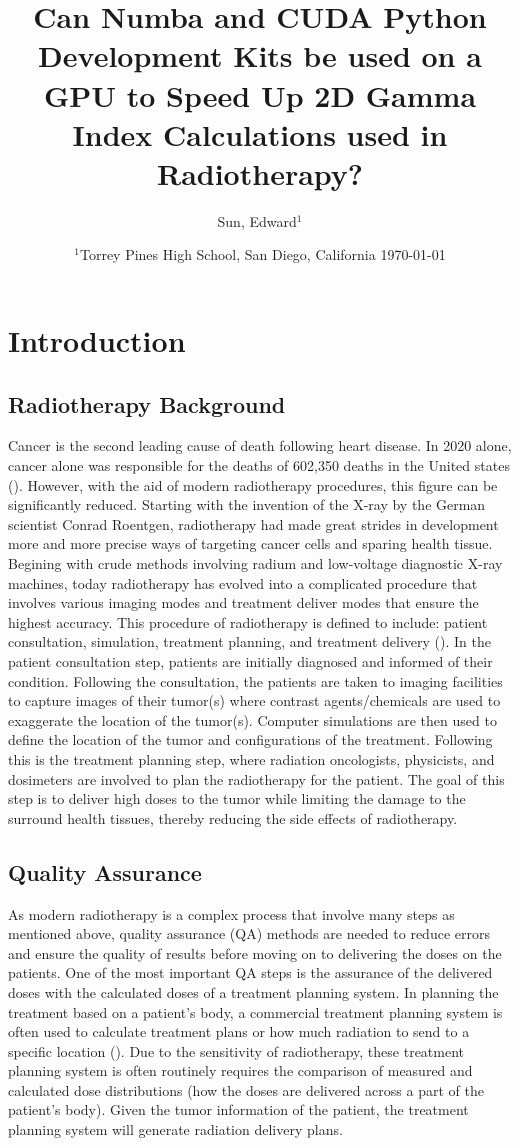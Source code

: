 \documentclass[12pt]{article}
\title{Can Numba and CUDA Python Development Kits be used on a GPU to Speed Up 2D Gamma Index Calculations used in Radiotherapy?}
\author{
  Sun, Edward$^{1}$
}
\date{%
  $^{1}$Torrey Pines High School, San Diego, California
  \today
}
\begin{document}
\maketitle
\section{Introduction}
\subsection{Radiotherapy Background}
Cancer is the second leading cause of death following heart disease. In 2020 alone, cancer alone was responsible for the deaths of 602,350 deaths in the United states (\textcite{CDC}). However, with the aid of modern radiotherapy procedures, this figure can be significantly reduced. Starting with the invention of the X-ray by the German scientist Conrad Roentgen, radiotherapy had made great strides in development more and more precise ways of targeting cancer cells and sparing health tissue. Begining with crude methods involving radium and low-voltage diagnostic X-ray machines, today radiotherapy has evolved into a complicated procedure that involves various imaging modes and treatment deliver modes that ensure the highest accuracy. This procedure of radiotherapy is defined to include: patient consultation, simulation, treatment planning, and treatment delivery (\textcite{SBU}). In the patient consultation step, patients are initially diagnosed and informed of their condition. Following the consultation, the patients are taken to imaging facilities to capture images of their tumor(s) where contrast agents/chemicals are used to exaggerate the location of the tumor(s). Computer simulations are then used to define the location of the tumor and configurations of the treatment. Following this is the treatment planning step, where radiation oncologists, physicists, and dosimeters are involved to plan the radiotherapy for the patient. The goal of this step is to deliver high doses to the tumor while limiting the damage to the surround health tissues, thereby reducing the side effects of radiotherapy.

\subsection{Quality Assurance}
As modern radiotherapy is a complex process that involve many steps as mentioned above, quality assurance (QA) methods are needed to reduce errors and ensure the quality of results before moving on to delivering the doses on the patients. One of the most important QA steps is the assurance of the delivered doses with the calculated doses of a treatment planning system. In planning the treatment based on a patient's body, a commercial treatment planning system is often used to calculate treatment plans or how much radiation to send to a specific location (\textcite{Gardner}). Due to the sensitivity of radiotherapy, these treatment planning system is often routinely requires the comparison of measured and calculated dose distributions (how the doses are delivered across a part of the patient's body). Given the tumor information of the patient, the treatment planning system will generate radiation delivery plans.
\end{document}
